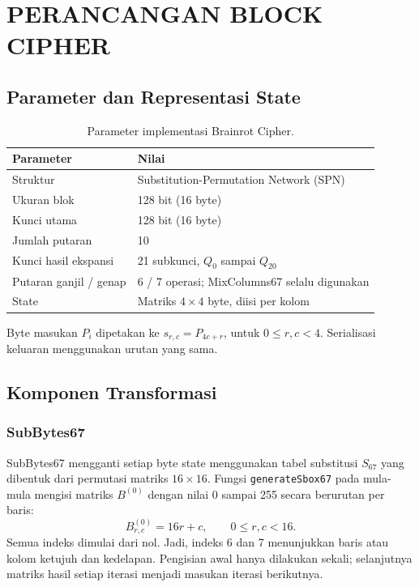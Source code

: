 \chapter{PERANCANGAN BLOCK CIPHER}
\label{bab:perancangan}

\section{Parameter dan Representasi State}
\begin{table}[htbp]
  \centering
  \caption{Parameter implementasi Brainrot Cipher.}
  \label{tab:parameter}
  \begin{tabularx}{\linewidth}{@{}lY@{}}
    \toprule Parameter & Nilai\\ \midrule
    Struktur & Substitution-Permutation Network (SPN)\\
    Ukuran blok & 128 bit (16 byte)\\
    Kunci utama & 128 bit (16 byte)\\
    Jumlah putaran & 10\\
    Kunci hasil ekspansi & 21 subkunci, $Q_0$ sampai $Q_{20}$\\
    Putaran ganjil / genap & 6 / 7 operasi; MixColumns67 selalu digunakan\\
    State & Matriks $4\times4$ byte, diisi per kolom\\
    \bottomrule
  \end{tabularx}
\end{table}
Byte masukan $P_i$ dipetakan ke $s_{r,c}=P_{4c+r}$, untuk $0\leq r,c<4$.
Serialisasi keluaran menggunakan urutan yang sama.

\section{Komponen Transformasi}
\subsection{SubBytes67}
SubBytes67 mengganti setiap byte state menggunakan tabel substitusi
$S_{67}$ yang dibentuk dari permutasi matriks $16\times16$. Fungsi \texttt{generateSbox67} pada
 mula-mula mengisi matriks $B^{(0)}$
dengan nilai 0 sampai 255 secara berurutan per baris:
\begin{equation}
  B^{(0)}_{r,c}=16r+c,\qquad 0\leq r,c<16.
\end{equation}
Semua indeks dimulai dari nol. Jadi, indeks 6 dan 7 menunjukkan baris
atau kolom ketujuh dan kedelapan. Pengisian awal hanya dilakukan sekali;
selanjutnya matriks hasil setiap iterasi menjadi masukan iterasi berikutnya.

